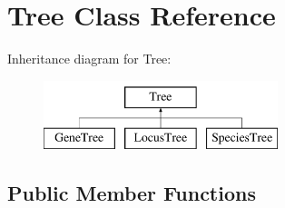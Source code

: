 \hypertarget{class_tree}{}\section{Tree Class Reference}
\label{class_tree}
Inheritance diagram for Tree\+:\begin{figure}[H]
\begin{center}
\leavevmode
\includegraphics[height=2.000000cm]{class_tree}
\end{center}
\end{figure}
\subsection*{Public Member Functions}
